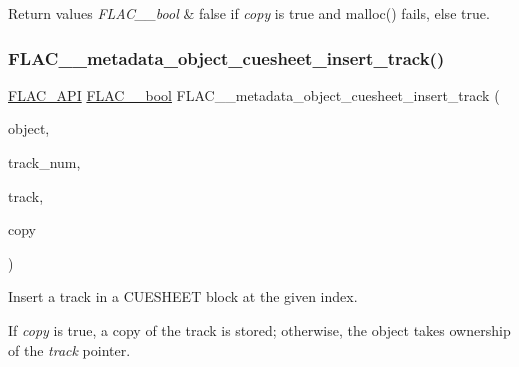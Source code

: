 \begin{DoxyRetVals}{Return values}
{\em F\+L\+A\+C\+\_\+\+\_\+bool} & {\ttfamily false} if {\itshape copy} is {\ttfamily true} and malloc() fails, else {\ttfamily true}. \\
\hline
\end{DoxyRetVals}
\mbox{\label{group__flac__metadata__object_ga5dbdffac2cd7e327f711103c15e015ac}} 
\subsubsection{\texorpdfstring{FLAC\_\_metadata\_object\_cuesheet\_insert\_track()}{FLAC\_\_metadata\_object\_cuesheet\_insert\_track()}}
{\footnotesize\ttfamily \mbox{\hyperlink{group__flac__export_ga56ca07df8a23310707732b1c0007d6f5}{F\+L\+A\+C\+\_\+\+A\+PI}} \mbox{\hyperlink{ordinals_8h_a95103469f1cbd78b8cf250194985b34e}{F\+L\+A\+C\+\_\+\+\_\+bool}} F\+L\+A\+C\+\_\+\+\_\+metadata\+\_\+object\+\_\+cuesheet\+\_\+insert\+\_\+track (\begin{DoxyParamCaption}\item[{\mbox{\hyperlink{struct_f_l_a_c_____stream_metadata}{F\+L\+A\+C\+\_\+\+\_\+\+Stream\+Metadata}} $\ast$}]{object,  }\item[{unsigned}]{track\+\_\+num,  }\item[{\mbox{\hyperlink{struct_f_l_a_c_____stream_metadata___cue_sheet___track}{F\+L\+A\+C\+\_\+\+\_\+\+Stream\+Metadata\+\_\+\+Cue\+Sheet\+\_\+\+Track}} $\ast$}]{track,  }\item[{\mbox{\hyperlink{ordinals_8h_a95103469f1cbd78b8cf250194985b34e}{F\+L\+A\+C\+\_\+\+\_\+bool}}}]{copy }\end{DoxyParamCaption})}

Insert a track in a C\+U\+E\+S\+H\+E\+ET block at the given index.

If {\itshape copy} is {\ttfamily true}, a copy of the track is stored; otherwise, the object takes ownership of the {\itshape track} pointer.



